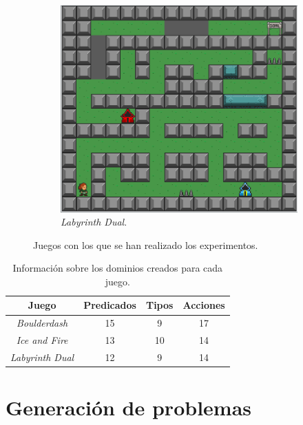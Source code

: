 \begin{figure}[H]
\begin{subfigure}[t]{0.5\textwidth}
        \includegraphics[scale=0.25]{img/CH08/labyrinth_dual.png}
        \caption{\textit{Labyrinth Dual}.}
        \label{fig:labyrinth_dual}
    \end{subfigure}
    \caption{Juegos con los que se han realizado los experimentos.}
    \label{fig:games}
\end{figure}

\begin{table}[H]
\centering
\begin{tabular}{|c|ccc|}
\hline
\textbf{Juego} & \textbf{Predicados} & \textbf{Tipos} & \textbf{Acciones} \\ \hline
\textit{Boulderdash} & 15 & 9 & 17 \\ \hline
\textit{Ice and Fire} & 13 & 10 & 14 \\ \hline
\textit{Labyrinth Dual} & 12 & 9 & 14 \\ \hline
\end{tabular}
\caption{Información sobre los dominios creados para cada juego.}
\label{tab:info-domains}
\end{table}

\section{Generación de problemas}

